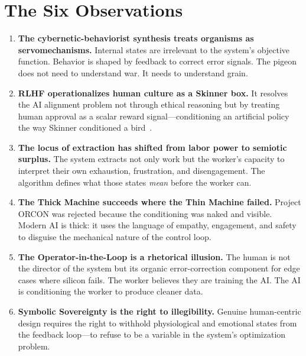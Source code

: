 \documentclass[runningheads]{llncs}
\begin{document}
\section{The Six Observations}

\begin{enumerate}

\item \textbf{The cybernetic-behaviorist synthesis treats organisms as
servomechanisms.} Internal states are irrelevant to the system's objective
function. Behavior is shaped by feedback to correct error signals. The pigeon
does not need to understand war. It needs to understand grain.

\item \textbf{RLHF operationalizes human culture as a Skinner box.} It resolves
the AI alignment problem not through ethical reasoning but by treating human
approval as a scalar reward signal---conditioning an artificial policy the way
Skinner conditioned a bird~\cite{sutton2018reinforcement}.

\item \textbf{The locus of extraction has shifted from labor power to semiotic
surplus.} The system extracts not only work but the worker's capacity to
interpret their own exhaustion, frustration, and disengagement. The algorithm
defines what those states \emph{mean} before the worker can.

\item \textbf{The Thick Machine succeeds where the Thin Machine failed.}
Project ORCON was rejected because the conditioning was naked and visible.
Modern AI is thick: it uses the language of empathy, engagement, and safety to
disguise the mechanical nature of the control loop.

\item \textbf{The Operator-in-the-Loop is a rhetorical illusion.} The human is
not the director of the system but its organic error-correction component for
edge cases where silicon fails. The worker believes they are training the AI.
The AI is conditioning the worker to produce cleaner data.

\item \textbf{Symbolic Sovereignty is the right to illegibility.} Genuine
human-centric design requires the right to withhold physiological and emotional
states from the feedback loop---to refuse to be a variable in the system's
optimization problem.

\end{enumerate}
\end{document}
